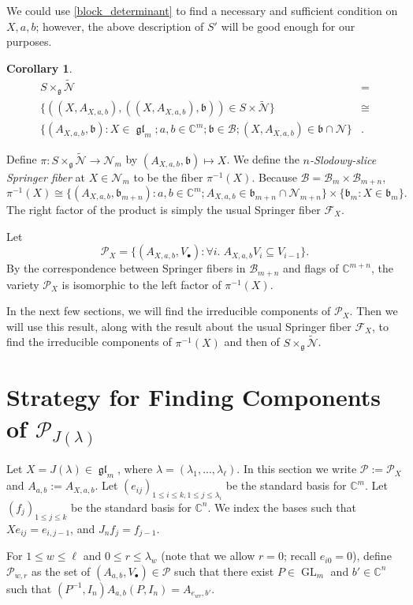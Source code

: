 \documentclass[12pt,psamsfonts]{article}
\DeclareMathOperator{\GL}{GL}
\DeclareMathOperator{\gl}{\mathfrak{gl}}
\newtheorem{corollary}[theorem]{Corollary}
\begin{document}
We could use \cref{block_determinant} to find a necessary and sufficient condition on \(X, a, b\); however, the above description of \(S'\) will be good enough for our purposes.
\begin{corollary}\label{sn_iso}
    \begin{align*}
        S \times_\mathfrak{g} \widetilde{\mathcal{N}} & = \\
        \{((X, A_{X, a, b}), ((X, A_{X, a, b}), \mathfrak{b})) \in S \times \widetilde{\mathcal{N}}\} & \cong \\
        \{(A_{X, a, b}, \mathfrak{b}) : X \in \gl_m; a,b \in \mathbb{C}^m; \mathfrak{b} \in \mathcal{B}; (X, A_{X, a, b}) \in \mathfrak{b} \cap \mathcal{N}\} & .
    \end{align*}
\end{corollary}
Define \(\pi : S \times_\mathfrak{g} \widetilde{\mathcal{N}} \to \mathcal{N}_m\) by \((A_{X, a, b}, \mathfrak{b}) \mapsto X\).
We define the \emph{\(n\)-Slodowy-slice Springer fiber} at \(X \in \mathcal{N}_m\) to be the fiber \(\pi^{-1}(X)\).
Because \(\mathcal{B} = \mathcal{B}_m \times \mathcal{B}_{m + n}\),  
\[\pi^{-1}(X) \cong \{(A_{X, a, b}, \mathfrak{b}_{m + n}) : a,b \in \mathbb{C}^m; A_{X, a, b} \in \mathfrak{b}_{m + n} \cap \mathcal{N}_{m + n}\} \times \{\mathfrak{b}_m : X \in \mathfrak{b}_m\}.\]
The right factor of the product is simply the usual Springer fiber \(\mathcal{F}_X\).
\par Let 
\[\mathcal{P}_X = \{(A_{X, a, b}, V_\bullet) : \forall i. \; A_{X, a, b} V_i \subseteq V_{i - 1}\}.\]
By the correspondence between Springer fibers in \(\mathcal{B}_{m + n}\) and flags of \(\mathbb{C}^{m + n}\), the variety \(\mathcal{P}_X\) is isomorphic to the left factor of \(\pi^{-1}(X)\).
\par In the next few sections, we will find the irreducible components of \(\mathcal{P}_X\).
Then we will use this result, along with the result about the usual Springer fiber \(\mathcal{F}_X\), to find the irreducible components of \(\pi^{-1}(X)\) and then of \(S \times_\mathfrak{g} \widetilde{\mathcal{N}}\).

\section{Strategy for Finding Components of \texorpdfstring{\(\mathcal{P}_{J(\lambda)}\)}{P\_\{J(\textbackslash lambda)\}}}\label{p_comp_strat}
\par Let \(X = J(\lambda) \in \gl_m\), where \(\lambda = (\lambda_1, ..., \lambda_\ell)\).
In this section we write \(\mathcal{P} := \mathcal{P}_X\) and \(A_{a, b} := A_{X, a, b}\).
Let \((e_{ij})_{1 \leq i \leq k, 1 \leq j \leq \lambda_i}\) be the standard basis for \(\mathbb{C}^m\).
Let \((f_j)_{1 \leq j \leq k}\) be the standard basis for \(\mathbb{C}^n\).
We index the bases such that \(Xe_{ij} = e_{i,j - 1}\), and \(J_n f_j = f_{j - 1}\).
\par For \(1 \leq w \leq \ell\) and \(0 \leq r \leq \lambda_w\) (note that we allow \(r = 0\); recall \(e_{i0} = 0\)), define \(\mathcal{P}_{w,r}\) as the set of \((A_{a,b}, V_\bullet) \in \mathcal{P}\) such that there exist \(P \in \GL_m\) and \(b' \in \mathbb{C}^n\) such that \((P^{-1}, I_n) A_{a, b} (P, I_n) = A_{e_{wr}, b'}\).
\end{document}
